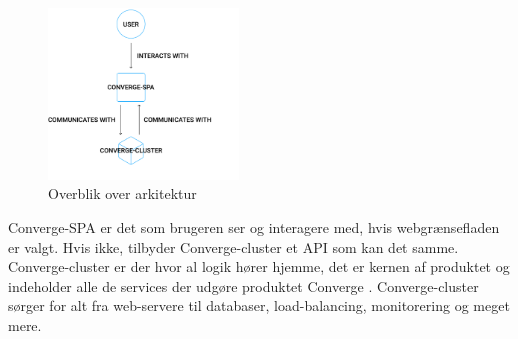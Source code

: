 \begin{figure}[H]
  \begin{small}
    \begin{center}
      \includegraphics[width=0.45\textwidth]{Billeder/Architecture.pdf}
    \end{center}
    \caption{Overblik over arkitektur}
    \label{fig:simple-architecture}
  \end{small}
\end{figure}

Converge-SPA er det som brugeren ser og interagere med, hvis webgrænsefladen er valgt. Hvis ikke, tilbyder Converge-cluster et API \cite[API]{converge-terms} som kan det samme. Converge-cluster er der hvor al logik hører hjemme, det er kernen af produktet og indeholder alle de services der udgøre produktet Converge \cite[Converge]{converge-terms}. Converge-cluster sørger for alt fra web-servere til databaser, load-balancing, monitorering og meget mere.